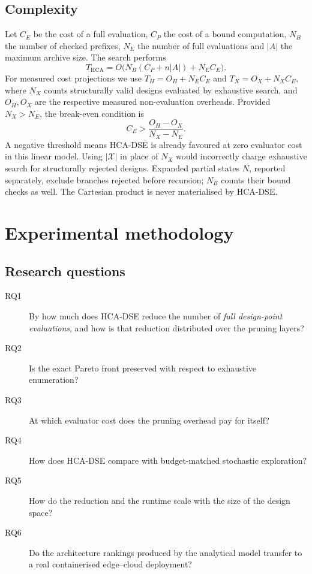 \documentclass[preprint,11pt,3p]{elsarticle}
\theoremstyle{plain}
\theoremstyle{definition}
\newcommand{\X}{\mathcal{X}}
\begin{document}
\subsection{Complexity}
Let $C_E$ be the cost of a full evaluation, $C_P$ the cost of a bound computation,
$N_B$ the number of checked prefixes, $N_E$ the number of full evaluations and $|A|$
the maximum archive size. The search performs
\begin{equation}
T_{\mathrm{HCA}}=O\big(N_B(C_P+n|A|)+N_E C_E\big).
\label{eq:complexity}
\end{equation}
For measured cost projections we use $T_H=O_H+N_E C_E$ and
$T_X=O_X+N_X C_E$, where $N_X$ counts structurally valid designs evaluated by
exhaustive search, and $O_H,O_X$ are the respective measured non-evaluation overheads.
Provided $N_X>N_E$, the break-even condition is
\begin{equation}
C_E > \frac{O_H-O_X}{N_X-N_E}.
\label{eq:breakeven}
\end{equation}
A negative threshold means HCA-DSE is already favoured at zero evaluator cost in this
linear model. Using $|\X|$ in place of $N_X$ would incorrectly charge exhaustive search
for structurally rejected designs. Expanded partial states $N$, reported separately,
exclude branches rejected before recursion; $N_B$ counts their bound checks as well.
The Cartesian product is never materialised by HCA-DSE.
\section{Experimental methodology}
\label{sec:methodology}

\subsection{Research questions}
\begin{description}
\item[RQ1] By how much does HCA-DSE reduce the number of \emph{full design-point
  evaluations}, and how is that reduction distributed over the pruning layers?
\item[RQ2] Is the exact Pareto front preserved with respect to exhaustive enumeration?
\item[RQ3] At which evaluator cost does the pruning overhead pay for itself?
\item[RQ4] How does HCA-DSE compare with budget-matched stochastic exploration?
\item[RQ5] How do the reduction and the runtime scale with the size of the design space?
\item[RQ6] Do the architecture rankings produced by the analytical model transfer to a
  real containerised edge--cloud deployment?
\end{description}
\end{document}
